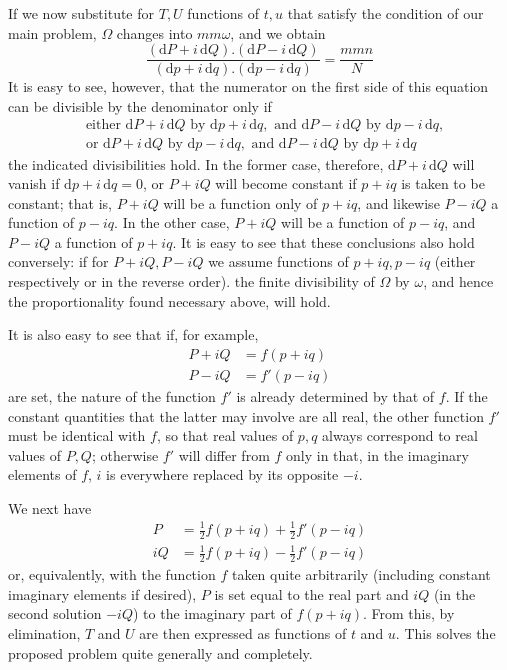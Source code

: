If we now substitute for \(T,U\) functions of \(t,u\) that satisfy the condition of our main problem, \(\Omega\) changes into \(mm\omega\), and we obtain
\[
\frac{(\mathrm{d}P+i\,\mathrm{d}Q)\mathord{.}(\mathrm{d}P-i\,\mathrm{d}Q)}{(\mathrm{d}p+i\,\mathrm{d}q)\mathord{.}(\mathrm{d}p-i\,\mathrm{d}q)}=\frac{mmn}{N}
\]
\noindent It is easy to see, however, that the numerator on the first side of this equation can be divisible by the denominator only if
\[
\begin{aligned}
&\text{either }\mathrm{d}P+i\,\mathrm{d}Q\text{ by }\mathrm{d}p+i\,\mathrm{d}q,\text{ and }\mathrm{d}P-i\,\mathrm{d}Q\text{ by }\mathrm{d}p-i\,\mathrm{d}q,\\
&\text{or }\mathrm{d}P+i\,\mathrm{d}Q\text{ by }\mathrm{d}p-i\,\mathrm{d}q,\text{ and }\mathrm{d}P-i\,\mathrm{d}Q\text{ by }\mathrm{d}p+i\,\mathrm{d}q
\end{aligned}
\]
\noindent the indicated divisibilities hold. In the former case, therefore, \(\mathrm{d}P+i\,\mathrm{d}Q\) will vanish if \(\mathrm{d}p+i\,\mathrm{d}q=0\), or \(P+iQ\) will become constant if \(p+iq\) is taken to be constant; that is, \(P+iQ\) will be a function only of \(p+iq\), and likewise \(P-iQ\) a function of \(p-iq\). In the other case, \(P+iQ\) will be a function of \(p-iq\), and \(P-iQ\) a function of \(p+iq\). It is easy to see that these conclusions also hold conversely: if for \(P+iQ,P-iQ\) we assume functions of \(p+iq,p-iq\) (either respectively or in the reverse order). the finite divisibility of \(\Omega\) by \(\omega\), and hence the proportionality found necessary above, will hold.

It is also easy to see that if, for example,
\[
\begin{aligned}
P+iQ&=f(p+iq)\\
P-iQ&=f'(p-iq)
\end{aligned}
\]
\noindent are set, the nature of the function \(f'\) is already determined by that of \(f\). If the constant quantities that the latter may involve are all real, the other function \(f'\) must be identical with \(f\), so that real values of \(p,q\) always correspond to real values of \(P,Q\); otherwise \(f'\) will differ from \(f\) only in that, in the imaginary elements of \(f\), \(i\) is everywhere replaced by its opposite \(-i\).

We next have
\[
\begin{aligned}
P&=\tfrac{1}{2}f(p+iq)+\tfrac{1}{2}f'(p-iq)\\
iQ&=\tfrac{1}{2}f(p+iq)-\tfrac{1}{2}f'(p-iq)
\end{aligned}
\]
\noindent or, equivalently, with the function \(f\) taken quite arbitrarily (including constant imaginary elements if desired), \(P\) is set equal to the real part and \(iQ\) (in the second solution \(-iQ\)) to the imaginary part of \(f(p+iq)\). From this, by elimination, \(T\) and \(U\) are then expressed as functions of \(t\) and \(u\). This solves the proposed problem quite generally and completely.

